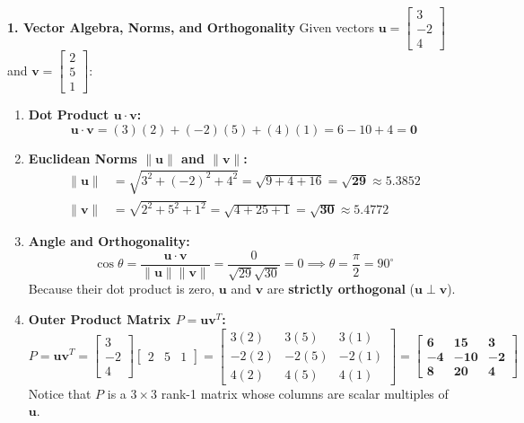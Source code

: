 \textbf{1. Vector Algebra, Norms, and Orthogonality}
Given vectors $\mathbf{u} = \begin{bmatrix} 3 \\ -2 \\ 4 \end{bmatrix}$ and $\mathbf{v} = \begin{bmatrix} 2 \\ 5 \\ 1 \end{bmatrix}$:
\begin{enumerate}
    \item \textbf{Dot Product $\mathbf{u} \cdot \mathbf{v}$:}
    \begin{equation*}
    \mathbf{u} \cdot \mathbf{v} = (3)(2) + (-2)(5) + (4)(1) = 6 - 10 + 4 = \mathbf{0}
    \end{equation*}
    \item \textbf{Euclidean Norms $\|\mathbf{u}\|$ and $\|\mathbf{v}\|$:}
    \begin{align*}
    \|\mathbf{u}\| &= \sqrt{3^2 + (-2)^2 + 4^2} = \sqrt{9 + 4 + 16} = \mathbf{\sqrt{29}} \approx 5.3852 \\
    \|\mathbf{v}\| &= \sqrt{2^2 + 5^2 + 1^2} = \sqrt{4 + 25 + 1} = \mathbf{\sqrt{30}} \approx 5.4772
    \end{align*}
    \item \textbf{Angle and Orthogonality:}
    \begin{equation*}
    \cos \theta = \frac{\mathbf{u} \cdot \mathbf{v}}{\|\mathbf{u}\| \|\mathbf{v}\|} = \frac{0}{\sqrt{29}\sqrt{30}} = 0 \implies \theta = \frac{\pi}{2} = 90^\circ
    \end{equation*}
    Because their dot product is zero, $\mathbf{u}$ and $\mathbf{v}$ are \textbf{strictly orthogonal} ($\mathbf{u} \perp \mathbf{v}$).
    \item \textbf{Outer Product Matrix $P = \mathbf{u} \mathbf{v}^T$:}
    \begin{equation*}
    P = \mathbf{u} \mathbf{v}^T = \begin{bmatrix} 3 \\ -2 \\ 4 \end{bmatrix} \begin{bmatrix} 2 & 5 & 1 \end{bmatrix} = \begin{bmatrix} 3(2) & 3(5) & 3(1) \\ -2(2) & -2(5) & -2(1) \\ 4(2) & 4(5) & 4(1) \end{bmatrix} = \mathbf{\begin{bmatrix} 6 & 15 & 3 \\ -4 & -10 & -2 \\ 8 & 20 & 4 \end{bmatrix}}
    \end{equation*}
    Notice that $P$ is a $3 \times 3$ rank-1 matrix whose columns are scalar multiples of $\mathbf{u}$.
\end{enumerate}

